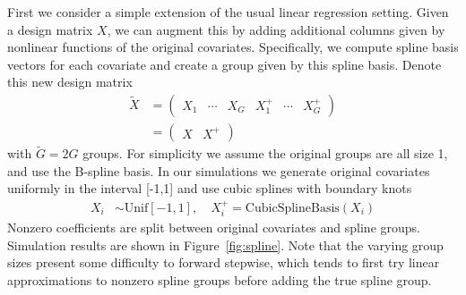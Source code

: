 \documentclass{imsart}
\begin{document}
First we consider a simple extension of the usual linear regression setting. Given a design matrix $X$, we can augment this by adding additional columns given by nonlinear functions of the original covariates. Specifically, we compute spline basis vectors for each covariate and create a group given by this spline basis. Denote this new design matrix
\begin{equation}
\label{eq:splinemat}
  \begin{aligned}
    \tilde X &=  \begin{pmatrix} X_1 & \cdots & X_G & X^+_1 & \cdots & X^+_G  \end{pmatrix}\\
    &= \begin{pmatrix} X & X^+ \end{pmatrix}
  \end{aligned}
\end{equation}
with $\tilde G = 2G$ groups. For simplicity we assume the original groups are all size 1, and use the B-spline basis. In our simulations we generate original covariates uniformly in the interval [-1,1] and use cubic splines with boundary knots
\begin{equation}
  \begin{aligned}
    X_i &\sim \text{Unif}[-1,1], \quad
    X_i^+ = \text{CubicSplineBasis}(X_i)
  \end{aligned}
\end{equation}
Nonzero coefficients are split between original covariates and spline groups. Simulation results are shown in Figure~\ref{fig:spline}. Note that the varying group sizes present some difficulty to forward stepwise, which tends to first try linear approximations to nonzero spline groups before adding the true spline group.
\end{document}
